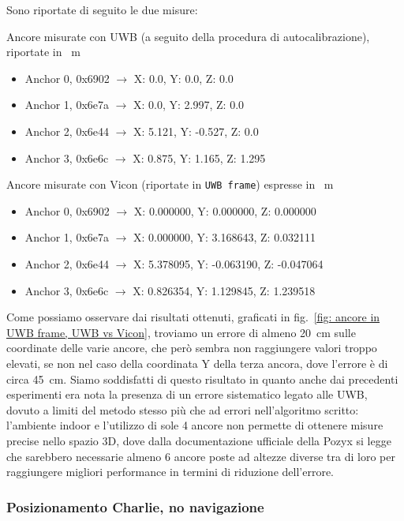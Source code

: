 Sono riportate di seguito le due misure:

Ancore misurate con UWB (a seguito della procedura di autocalibrazione), riportate in \SI{}{\metre}
\begin{itemize}
	\item Anchor 0, 0x6902 $\rightarrow$ X: 0.0, 	Y: 0.0, 	Z: 0.0
	\item Anchor 1, 0x6e7a $\rightarrow$ X: 0.0, 	Y: 2.997, 	Z: 0.0
	\item Anchor 2, 0x6e44 $\rightarrow$ X: 5.121, Y: -0.527, 	Z: 0.0
	\item Anchor 3, 0x6e6c $\rightarrow$ X: 0.875,	Y: 1.165, 	Z: 1.295
\end{itemize}

Ancore misurate con Vicon (riportate in \verb|UWB frame|) espresse in \SI{}{\metre}
\begin{itemize}
	\item Anchor 0, 0x6902 $\rightarrow$ X: 0.000000,	Y: 0.000000,	Z: 0.000000
	\item Anchor 1, 0x6e7a $\rightarrow$ X: 0.000000,	Y: 3.168643,	Z: 0.032111
	\item Anchor 2, 0x6e44 $\rightarrow$ X: 5.378095,	Y: -0.063190,	Z: -0.047064
	\item Anchor 3, 0x6e6c $\rightarrow$ X: 0.826354,	Y: 1.129845,	Z: 1.239518
\end{itemize}


Come possiamo osservare dai risultati ottenuti, graficati in fig.~\ref{fig: ancore in UWB frame, UWB vs Vicon}, troviamo un errore di almeno \SI{20}{\centi \metre} sulle coordinate delle varie ancore, che però sembra non raggiungere valori troppo elevati, se non nel caso della coordinata Y della terza ancora, dove l'errore è di circa 
\SI{45}{\centi \metre}. 
Siamo soddisfatti di questo risultato in quanto anche dai precedenti esperimenti era nota la presenza di un errore sistematico legato alle UWB, dovuto a limiti del metodo stesso più che ad errori nell'algoritmo scritto: l'ambiente indoor e l'utilizzo di sole 4 ancore non permette di ottenere misure precise nello spazio 3D, dove dalla documentazione ufficiale della Pozyx si legge che sarebbero necessarie almeno 6 ancore poste ad altezze diverse tra di loro per raggiungere migliori performance in termini di riduzione dell'errore.

\subsubsection{Posizionamento Charlie, no navigazione}

